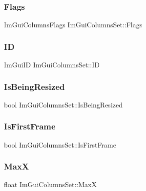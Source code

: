 \subsubsection{\texorpdfstring{Flags}{Flags}}
{\footnotesize\ttfamily Im\+Gui\+Columns\+Flags Im\+Gui\+Columns\+Set\+::\+Flags}

\hypertarget{struct_im_gui_columns_set_af0d52f764471e070d0beca0526090e10}{}\label{struct_im_gui_columns_set_af0d52f764471e070d0beca0526090e10} 
\subsubsection{\texorpdfstring{ID}{ID}}
{\footnotesize\ttfamily Im\+Gui\+ID Im\+Gui\+Columns\+Set\+::\+ID}

\hypertarget{struct_im_gui_columns_set_af9ef4186dd06147173a0e1dc12085399}{}\label{struct_im_gui_columns_set_af9ef4186dd06147173a0e1dc12085399} 
\subsubsection{\texorpdfstring{Is\+Being\+Resized}{IsBeingResized}}
{\footnotesize\ttfamily bool Im\+Gui\+Columns\+Set\+::\+Is\+Being\+Resized}

\hypertarget{struct_im_gui_columns_set_a814bdfd8c72548d2c93675c8d6e974e9}{}\label{struct_im_gui_columns_set_a814bdfd8c72548d2c93675c8d6e974e9} 
\subsubsection{\texorpdfstring{Is\+First\+Frame}{IsFirstFrame}}
{\footnotesize\ttfamily bool Im\+Gui\+Columns\+Set\+::\+Is\+First\+Frame}

\hypertarget{struct_im_gui_columns_set_acea08c0e12158b9db78d499f1bb1242b}{}\label{struct_im_gui_columns_set_acea08c0e12158b9db78d499f1bb1242b} 
\subsubsection{\texorpdfstring{MaxX}{MaxX}}
{\footnotesize\ttfamily float Im\+Gui\+Columns\+Set\+::\+MaxX}

